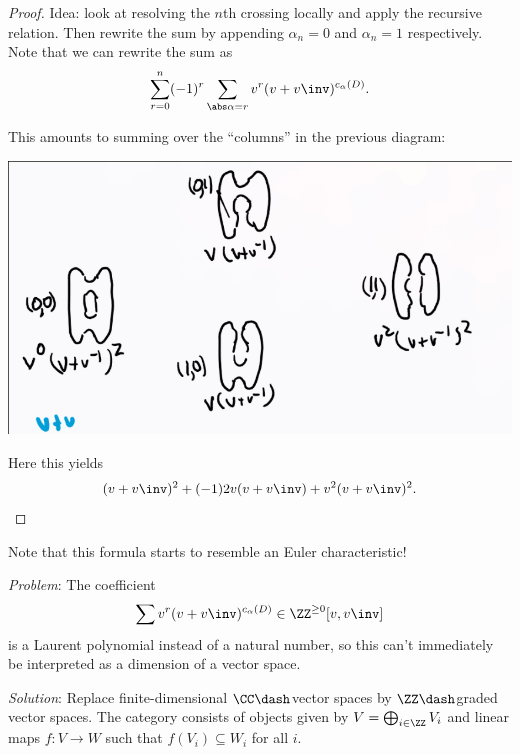 \begin{proof}

Idea: look at resolving the \(n\)th crossing locally and apply the
recursive relation. Then rewrite the sum by appending \(\alpha_n = 0\)
and \(\alpha_n = 1\) respectively. Note that we can rewrite the sum as
\begin{align*}
\sum_{r=0}^n (-1)^r \sum_{\abs \alpha = r} v^r (v+v\inv)^{c_\alpha(D)}
.\end{align*}

This amounts to summing over the ``columns'' in the previous diagram:

\includegraphics{figures/image_2020-07-07-11-22-49.png}

Here this yields
\begin{align*}
(v+v\inv)^2 + (-1)2v(v+v\inv) + v^2 (v+v\inv)^2
.\end{align*}

\end{proof}

Note that this formula starts to resemble an Euler characteristic!

\begin{remark}

\emph{Problem}: The coefficient
\begin{align*}
\sum v^r(v+v\inv)^{c_\alpha(D)} \in \ZZ^{\geq 0}[v, v\inv]
\end{align*} is a Laurent polynomial instead of a natural number, so
this can't immediately be interpreted as a dimension of a vector space.

\emph{Solution}: Replace finite-dimensional \(\CC\dash\)vector spaces by
\(\ZZ\dash\)graded vector spaces. The category consists of objects given
by \(V = \bigoplus_{i\in \ZZ} V_i\) and linear maps \(f:V\to W\) such
that \(f(V_i) \subseteq W_i\) for all \(i\).

\end{remark}

